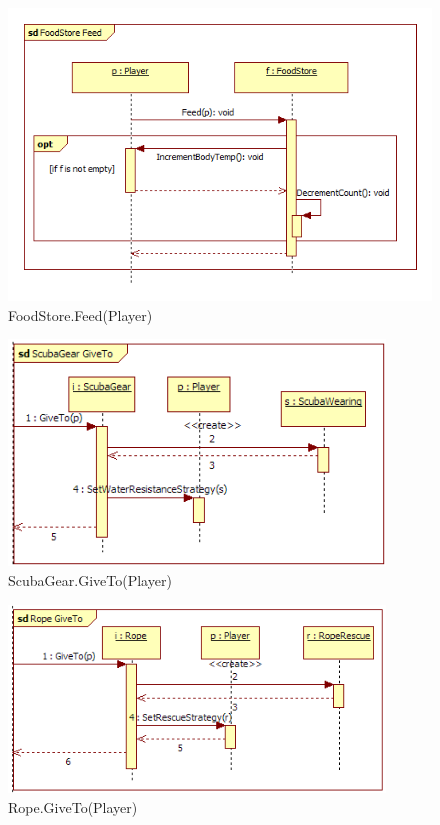 \begin{figure}[H]
	\begin{center}
		\includegraphics[width=12cm]{chapters/chapter03/seqdiag/FoodStore_Feed.png}
		\caption{FoodStore.Feed(Player)}
		\label{fig:FoodStoreFeed}
	\end{center}
\end{figure}
\begin{figure}[H]
	\begin{center}
		\includegraphics[width=10cm]{chapters/chapter03/seqdiag/ScubaGear_GiveTo.png}
		\caption{ScubaGear.GiveTo(Player)}
		\label{fig:ScubaGearGiveTo}
	\end{center}
\end{figure}
\begin{figure}[H]
	\begin{center}
		\includegraphics[width=10cm]{chapters/chapter03/seqdiag/Rope_GiveTo.png}
		\caption{Rope.GiveTo(Player)}
		\label{fig:RopeGiveTo}
	\end{center}
\end{figure}
